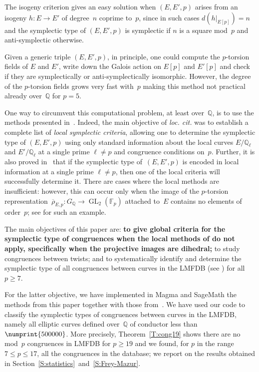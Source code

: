 \documentclass[12pt, reqno]{amsart}
\newcommand{\F}{\mathbb{F}}
\newcommand{\Q}{\mathbb{Q}}
\newcommand{\rhobar}{{\overline{\rho}}}
\newcommand{\GL}{\operatorname{GL}}
\numberwithin{equation}{section}
\theoremstyle{definition}
\theoremstyle{remark}
\newcommand{\Sage}{{\sc SageMath}}
\newcommand{\Magma}{{\sc Magma}}
\begin{document}
The isogeny criterion gives an easy solution when $(E,E',p)$
arises from an isogeny $h \colon E \to E'$ of degree~$n$ coprime
to~$p$, since in such cases $d(h|_{E[p]}) = n$ and the symplectic type
of $(E,E',p)$ is symplectic if $n$ is a square mod~$p$ and
anti-symplectic otherwise.

Given a generic triple $(E, E', p)$, in principle, one
could compute the $p$-torsion fields of $E$ and $E'$,
write down the Galois action on $E[p]$ and $E'[p]$ and check if they
are symplectically or anti-symplectically isomorphic. However, the
degree of the $p$-torsion fields grows very fast with~$p$ making this
method not practical already over~$\Q$ for $p = 5$.

One way to circumvent this computational problem, at least over~$\Q$, is to use the methods
presented in~\cite{FKSym}. Indeed, the main objective of {\it loc. cit.} was to establish a complete list of {\em local symplectic criteria},
allowing one to determine the symplectic type of $(E,E',p)$ using only
standard information about the local curves $E/\Q_\ell$ and
$E'/\Q_\ell$ at a single prime $\ell \neq p$ and congruence conditions
on~$p$. Further, it is also proved in~\cite{FKSym}  that if the
symplectic type of~$(E,E',p)$ is encoded in local information at a
single prime $\ell \neq p$, then one of the local criteria will
successfully determine it.  
There are cases where the local methods
are insufficient: however, this can occur only when the image
of the $p$-torsion representation~$\rhobar_{E,p} : G_\Q \to \GL_2(\F_p)$ attached to~$E$ contains no elements of order~$p$;
see \cite[Proposition~16]{FKSym} for such an example.

The main objectives of this paper are: {\bf to give global criteria for the
symplectic type of congruences when the local methods of \cite{FKSym}
do not apply, specifically when the projective images are dihedral;} to
study congruences between twists; and to systematically identify and
determine the symplectic type of all congruences between curves in the
LMFDB (see \cite{lmfdb})
for all~$p\ge7$.


For the latter objective, we have implemented in {\Magma} \cite{magma}
and {\Sage} \cite{sage} the methods from this paper together with
those from~\cite{FKSym}. We have used our code to classify the
symplectic types of congruences between curves in the LMFDB, namely
all elliptic curves defined over~$\Q$ of conductor less
than~$\numprint{500000}$. More precisely, Theorem~\ref{T:cong19} shows
there are no mod~$p$ congruences in LMFDB for $p \geq 19$ and we
found, for $p$ in the range $7 \leq p \leq 17$, all the congruences in
the database; we report on the results obtained in
Section~\ref{S:statistics}~and~\ref{S:Frey-Mazur}.
\end{document}
